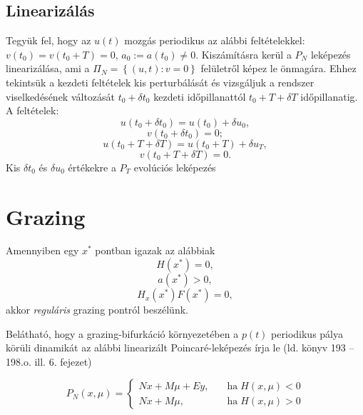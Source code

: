 \subsection{Linearizálás}

Tegyük fel, hogy az $u(t)$ mozgás periodikus az alábbi feltételekkel: $v(t_0)=v(t_0+T)=0$, $a_0:=a(t_0)\neq 0$. Kiszámításra kerül a $P_N$ leképezés linearizálása, ami a $\Pi_N=\left\{(u,t):v=0\right\}$ felületről képez le önmagára. Ehhez tekintsük a kezdeti feltételek kis perturbálását és vizsgáljuk a rendszer viselkedésének változását $t_0+\delta t_0$ kezdeti időpillanattól $t_0+T+\delta T$ időpillanatig. A feltételek:
\begin{equation}
u(t_0+\delta t_0)=u(t_0)+\delta u_0,
\end{equation}
\begin{equation}
v(t_0+\delta t_0)=0;
\end{equation}
\begin{equation}
u(t_0+T+\delta T)=u(t_0+T)+\delta u_T,
\end{equation}
\begin{equation}
v(t_0+T+\delta T)=0.
\end{equation}
Kis $\delta t_0$ és $\delta u_0$ értékekre a $P_T$ evolúciós leképezés 
\section{Grazing}

Amennyiben egy $x^*$ pontban igazak az alábbiak
\begin{equation}
H(x^*)=0,
\end{equation}
\begin{equation}
a(x^*)>0,
\end{equation}
\begin{equation}
H_x(x^*) F(x^*) = 0,
\end{equation}
akkor \emph{reguláris} grazing pontról beszélünk.

Belátható, hogy a grazing-bifurkáció környezetében a $p(t)$ periodikus pálya körüli dinamikát az alábbi linearizált Poincaré-leképezés  írja le (ld. könyv 193 -- 198.o. ill. 6. fejezet)

\begin{equation}\label{eq:nordmark}
P_N(x,\mu)=\begin{cases}
Nx+M\mu+Ey, \quad &\text{ha} \; H(x,\mu)<0\\
Nx+M\mu, &\text{ha} \; H(x,\mu)>0
\end{cases}
\end{equation}

